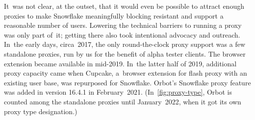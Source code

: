 \documentclass[letterpaper,twocolumn]{article}
\begin{document}
It~was not clear, at the outset,
that it would even be possible to attract
enough proxies to make Snowflake meaningfully blocking resistant
and support a reasonable number of users.
Lowering the technical barriers to running a proxy was only part of~it;
getting there also took intentional advocacy and outreach.
In~the early days, circa~2017,
the only round-the-clock proxy support was
a few standalone proxies,
run by us for the benefit of alpha tester clients.
The browser extension became available in mid-2019.
In~the latter half of 2019,
additional proxy capacity came when Cupcake,
a~browser extension for flash proxy with an existing user base,
was repurposed for Snowflake.
Orbot's Snowflake proxy feature was added in version 16.4.1 in February~2021.
(In~\autoref{fig:proxy-type}, Orbot is counted among the standalone proxies
until January~2022, when it got its own proxy type designation.)
\end{document}
